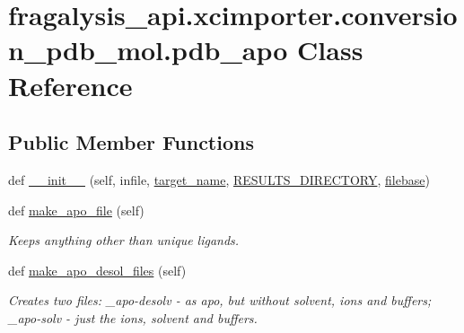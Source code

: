 \hypertarget{classfragalysis__api_1_1xcimporter_1_1conversion__pdb__mol_1_1pdb__apo}{}\section{fragalysis\+\_\+api.\+xcimporter.\+conversion\+\_\+pdb\+\_\+mol.\+pdb\+\_\+apo Class Reference}
\label{classfragalysis__api_1_1xcimporter_1_1conversion__pdb__mol_1_1pdb__apo}
\subsection*{Public Member Functions}
\begin{DoxyCompactItemize}
\item 
def \hyperlink{classfragalysis__api_1_1xcimporter_1_1conversion__pdb__mol_1_1pdb__apo_a4653e7fd666b7fd8e5bc4fe230e5e424}{\+\_\+\+\_\+init\+\_\+\+\_\+} (self, infile, \hyperlink{classfragalysis__api_1_1xcimporter_1_1conversion__pdb__mol_1_1pdb__apo_a334c98d4dfa204c7673f2f0bffdc60e1}{target\+\_\+name}, \hyperlink{classfragalysis__api_1_1xcimporter_1_1conversion__pdb__mol_1_1pdb__apo_a110bfcd93d73bebd25ec64b258bd5b6a}{R\+E\+S\+U\+L\+T\+S\+\_\+\+D\+I\+R\+E\+C\+T\+O\+RY}, \hyperlink{classfragalysis__api_1_1xcimporter_1_1conversion__pdb__mol_1_1pdb__apo_a120a453eb2a3608650eda92ee0dc9ef9}{filebase})
\item 
def \hyperlink{classfragalysis__api_1_1xcimporter_1_1conversion__pdb__mol_1_1pdb__apo_a08488b34eeb131d43d3139ecbbdb78fb}{make\+\_\+apo\+\_\+file} (self)
\begin{DoxyCompactList}\small\item\em Keeps anything other than unique ligands. \end{DoxyCompactList}\item 
def \hyperlink{classfragalysis__api_1_1xcimporter_1_1conversion__pdb__mol_1_1pdb__apo_ab88e88fe9d512e1635e5f1d61040f9f6}{make\+\_\+apo\+\_\+desol\+\_\+files} (self)
\begin{DoxyCompactList}\small\item\em Creates two files\+: \+\_\+apo-\/desolv -\/ as apo, but without solvent, ions and buffers; \+\_\+apo-\/solv -\/ just the ions, solvent and buffers. \end{DoxyCompactList}\end{DoxyCompactItemize}
